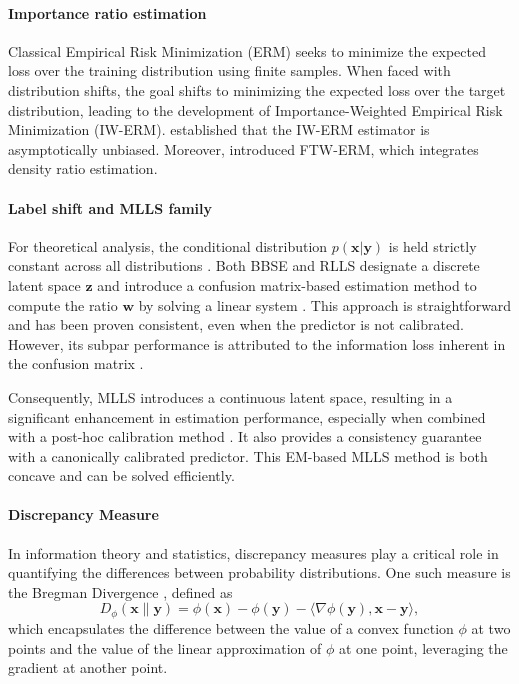 \paragraph{Importance ratio estimation} 
Classical Empirical Risk Minimization (ERM) seeks to minimize the expected loss over the training distribution using finite samples. When faced with distribution shifts, the goal shifts to minimizing the expected loss over the target distribution, leading to the development of Importance-Weighted Empirical Risk Minimization (IW-ERM)\citep{shimodaira2000improving, sugiyama2006importance, byrd2019effect, fang2020rethinking}. \citet{shimodaira2000improving} established that the IW-ERM estimator is asymptotically unbiased. Moreover, \citet{ali2023federated} introduced FTW-ERM, which integrates density ratio estimation.


\paragraph{Label shift and MLLS family}
For theoretical analysis, the conditional distribution \( p(\boldsymbol{x}|\boldsymbol{y}) \) is held strictly constant across all distributions \citep{bbse, mlls, bbse_2002}. Both BBSE \citep{bbse} and RLLS \citep{rlls} designate a discrete latent space \( \boldsymbol{z} \) and introduce a confusion matrix-based estimation method to compute the ratio \( \boldsymbol{w} \) by solving a linear system \citep{bbse_2002, bbse}. This approach is straightforward and has been proven consistent, even when the predictor is not calibrated. However, its subpar performance is attributed to the information loss inherent in the confusion matrix \citep{mlls}.

Consequently, MLLS \citep{mlls} introduces a continuous latent space, resulting in a significant enhancement in estimation performance, especially when combined with a post-hoc calibration method \citep{bct}. It also provides a consistency guarantee with a canonically calibrated predictor. This EM-based MLLS method is both concave and can be solved efficiently.


\paragraph{Discrepancy Measure}
In information theory and statistics, discrepancy measures play a critical role in quantifying the differences between probability distributions. One such measure is the Bregman Divergence \citep{bregman}, defined as 
\[D_\phi(\boldsymbol{x} \| \boldsymbol{y}) = \phi(\boldsymbol{x}) - \phi(\boldsymbol{y}) - \langle \nabla \phi(\boldsymbol{y}), \boldsymbol{x} - \boldsymbol{y} \rangle,\] 
which encapsulates the difference between the value of a convex function \(\phi\) at two points and the value of the linear approximation of \(\phi\) at one point, leveraging the gradient at another point.

